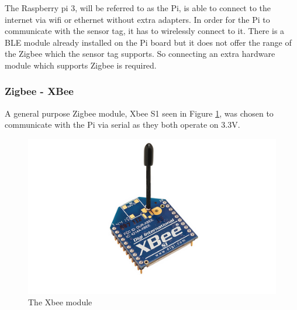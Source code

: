 The Raspberry pi 3, will be referred to as the Pi, is able to connect to the internet via wifi or ethernet without extra adapters. In order for the Pi to communicate with the sensor tag, it has to wirelessly connect to it. There is a BLE module already installed on the Pi board but it does not offer the range of the Zigbee \cite{zigbee} which the sensor tag supports. So connecting an extra hardware module which supports Zigbee is required.

\subsubsection{Zigbee - XBee}

A general purpose Zigbee module, Xbee S1 \cite{xbee} seen in Figure \ref{fig:Xbees}, was chosen to communicate with the Pi via serial as they both operate on 3.3V.

\begin{figure}[!h]
	\includegraphics[width=\linewidth]{xbee}
	\caption{The Xbee module \cite{xbee}}
	\label{fig:Xbees}
\end{figure}



